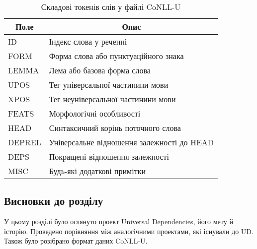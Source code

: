 \begin{table}[ht]
\caption{Складові токенів слів у файлі CoNLL-U}
\label{table:conllu}
\centering
\begin{tabular}{|l|l|}
\hline
\multicolumn{1}{|c|}{Поле} & \multicolumn{1}{|c|}{Опис} \\ \hline
  
ID        & Індекс слова у реченні \\ \hline
FORM      & Форма слова або пунктуаційного знака \\ \hline
LEMMA     & Лема або базова форма слова \\ \hline
UPOS      & Тег універсальної частинини мови \\ \hline
XPOS      & Тег неуніверсальної частинини мови \\ \hline
FEATS     & Морфологічні особливості \\ \hline
HEAD      & Синтаксичний корінь поточного слова \\ \hline
DEPREL    & Універсальне відношення залежності до HEAD \\ \hline
DEPS      & Покращені відношення залежності \\ \hline
MISC      & Будь-які додаткові примітки \\ \hline
\end{tabular}
\end{table}

\subsection*{Висновки до розділу }
У цьому розділі було оглянуто проект Universal Dependencies, його мету й
історію. Проведено порівняння між аналогічними проектами, які існували до UD.
Також було розібрано формат даних CoNLL\nobreakdash-U.